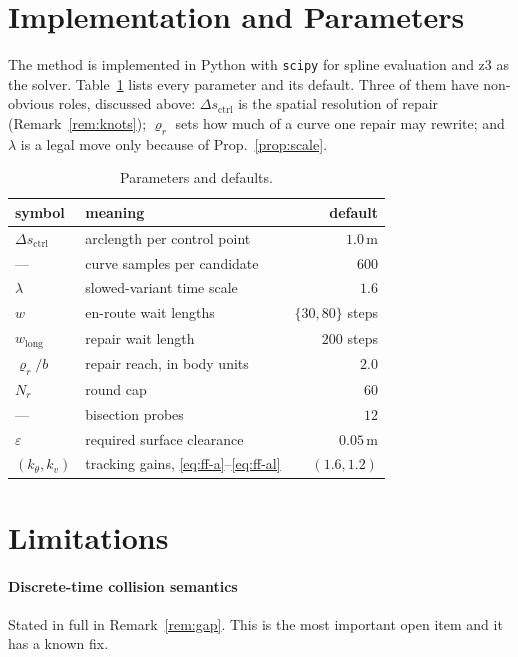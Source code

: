 \documentclass[conference]{IEEEtran}
\newcommand{\clr}{\varepsilon}
\begin{document}
\section{Implementation and Parameters}

The method is implemented in Python with \texttt{scipy} for spline evaluation and z3
\cite{z3} as the solver. Table~\ref{tab:params} lists every parameter and its default.
Three of them have non-obvious roles, discussed above:
$\Delta s_{\text{ctrl}}$ is the spatial resolution of repair (Remark~\ref{rem:knots});
$\varrho_r$ sets how much of a curve one repair may rewrite; and $\lambda$ is a legal move
only because of Prop.~\ref{prop:scale}.

\begin{table}[t]
\caption{Parameters and defaults.}
\label{tab:params}
\centering
\small
\begin{tabular}{llr}
\toprule
symbol & meaning & default \\
\midrule
$\Delta s_{\text{ctrl}}$ & arclength per control point & $1.0$\,m \\
--- & curve samples per candidate & $600$ \\
$\lambda$ & slowed-variant time scale & $1.6$ \\
$w$ & en-route wait lengths & $\{30, 80\}$ steps \\
$w_{\text{long}}$ & repair wait length & $200$ steps \\
$\varrho_r/b$ & repair reach, in body units & $2.0$ \\
$N_r$ & round cap & $60$ \\
--- & bisection probes & $12$ \\
$\clr$ & required surface clearance & $0.05$\,m \\
$(k_\theta, k_v)$ & tracking gains, \eqref{eq:ff-a}--\eqref{eq:ff-al} & $(1.6, 1.2)$ \\
\bottomrule
\end{tabular}
\end{table}

\section{Limitations}
\label{sec:limits}

\paragraph*{Discrete-time collision semantics}
Stated in full in Remark~\ref{rem:gap}. This is the most important open item and it has a
known fix.
\end{document}
